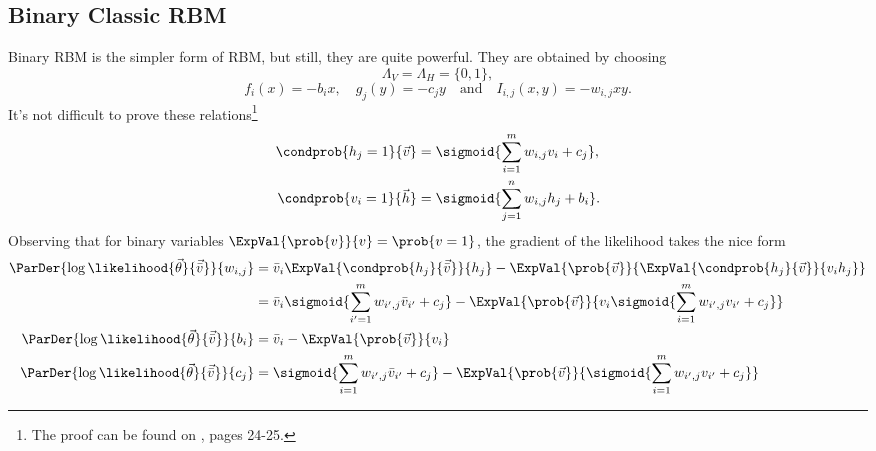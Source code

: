   \subsection{Binary Classic RBM} \label{subsec:binary-classic-RBM}
  Binary RBM is the simpler form of RBM, but still, they are quite powerful.
  They are obtained by choosing
  \[\Lambda_V = \Lambda_H = \{0,1\},\]
  \[
    f_i(x) = -b_ix, \quad g_j(y) = -c_jy  \quad\text{and}\quad I_{i,j}(x,y)=-w_{i,j}xy.
  \]
  It's not difficult to prove these relations\footnote{The proof can be found on
  \cite{fischer2012introduction}, pages 24-25.}
  \begin{align}
    \label{eq:prob-one-hidden-given-visible}
    \condprob{h_j=1}{\vec{v}} &= \sigmoid{\sum_{i=1}^m w_{i,j}v_i+c_j},\\
    \label{eq:prob-one-visible-given-hidden}
    \condprob{v_i=1}{\vec{h}} &= \sigmoid{\sum_{j=1}^n w_{i,j}h_j+b_i}.
  \end{align}
  Observing that for binary variables \(\ExpVal{\prob{v}}{v} = \prob{v=1}\), the gradient of
  the likelihood takes the nice form
  \begin{align}
    \nonumber
    \ParDer{\log\likelihood{\vec{\theta}}{\vec{\bar{v}}}}{w_{i,j}}
      &= \bar{v}_i\ExpVal{\condprob{h_j}{\vec{\bar{v}}}}{h_j} 
         -\ExpVal{\prob{\vec{v}}}{\ExpVal{\condprob{h_j}{\vec{v}}}{v_ih_j}} \\
      \label{eq:logL-gradient-w-RBM}
      &= \bar{v}_i \sigmoid{\sum_{i'=1}^m w_{i',j}\bar{v}_{i'}+c_j}
         -\ExpVal{\prob{\vec{v}}}{v_i \sigmoid{\sum_{i=1}^m w_{i',j}v_{i'}+c_j}} \\
    \ParDer{\log\likelihood{\vec{\theta}}{\vec{\bar{v}}}}{b_i}
      &= \bar{v}_i -\ExpVal{\prob{\vec{v}}}{v_i} \\
    \ParDer{\log\likelihood{\vec{\theta}}{\vec{\bar{v}}}}{c_j}
      &= \sigmoid{\sum_{i=1}^m w_{i',j}\bar{v}_{i'}+c_j}
         -\ExpVal{\prob{\vec{v}}}{\sigmoid{\sum_{i=1}^m w_{i',j}v_{i'}+c_j}}
  \end{align}
